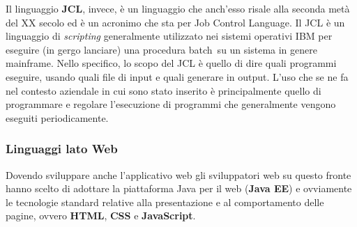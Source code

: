 	Il linguaggio \textbf{JCL}, invece, è un linguaggio che anch'esso risale alla seconda metà del XX secolo ed è un acronimo che sta per Job Control Language. Il JCL è un linguaggio di \textit{scripting} generalmente utilizzato nei sistemi operativi IBM per eseguire (in gergo lanciare) una procedura batch\glossario\ su un sistema in genere mainframe. Nello specifico, lo scopo del JCL è quello di dire quali programmi eseguire, usando quali file di input e quali generare in output. L'uso che se ne fa nel contesto aziendale in cui sono stato inserito è principalmente quello di programmare e regolare l'esecuzione di programmi che generalmente vengono eseguiti periodicamente.

	\subsubsection{Linguaggi lato Web}

	Dovendo sviluppare anche l'applicativo web gli sviluppatori web su questo
fronte hanno scelto di adottare la piattaforma Java per il web (\textbf{Java EE}) e ovviamente le tecnologie standard relative alla presentazione e al comportamento delle pagine, ovvero \textbf{HTML}, \textbf{CSS} e \textbf{JavaScript}.\\

